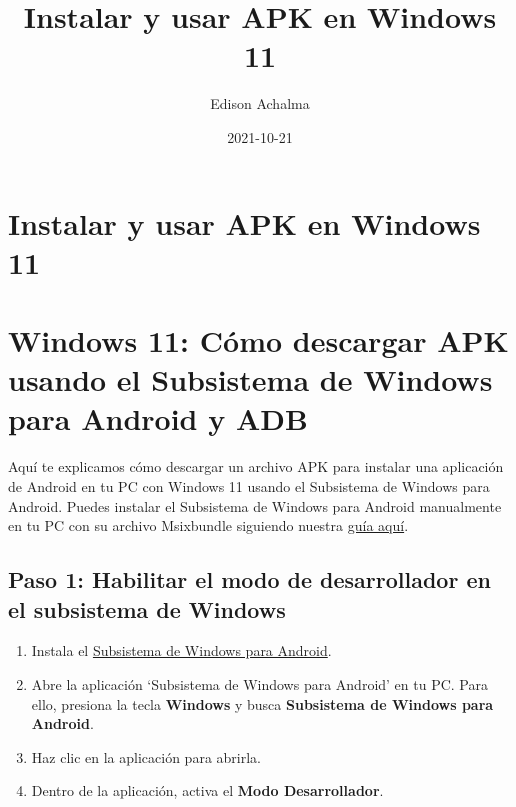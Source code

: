 \documentclass[
  doc,
  floatsintext,
  longtable,
  a4paper,
  nolmodern,
  notxfonts,
  notimes,
  12pt,
  colorlinks=true,linkcolor=blue,citecolor=blue,urlcolor=blue]{apa7}
\title{Instalar y usar APK en Windows 11}
\author{Edison Achalma}
\affiliation{
{Escuela Profesional de Economía, Universidad Nacional de San Cristóbal
de Huamanga}}
\date{2021-10-21}
\providecommand{\tightlist}{%
  \setlength{\itemsep}{0pt}\setlength{\parskip}{0pt}}
\begin{document}
\maketitle


\hypertarget{toc}{}
\tableofcontents
\newpage
\section[Introduction]{Instalar y usar APK en Windows 11}

\setcounter{secnumdepth}{3}

\setlength\LTleft{0pt}




\section{Windows 11: Cómo descargar APK usando el Subsistema de Windows
para Android y
ADB}\label{windows-11-cuxf3mo-descargar-apk-usando-el-subsistema-de-windows-para-android-y-adb}

Aquí te explicamos cómo descargar un archivo APK para instalar una
aplicación de Android en tu PC con Windows 11 usando el Subsistema de
Windows para Android. Puedes instalar el Subsistema de Windows para
Android manualmente en tu PC con su archivo Msixbundle siguiendo nuestra
\href{https://nerdschalk.com/android-apps-on-windows-11-dev-channel-how-to-install-windows-subsystem-for-android-manually-with-msixbundle/}{guía
aquí}.

\subsection{Paso 1: Habilitar el modo de desarrollador en el subsistema
de
Windows}\label{paso-1-habilitar-el-modo-de-desarrollador-en-el-subsistema-de-windows}

\begin{enumerate}
\def\labelenumi{\arabic{enumi}.}
\tightlist
\item
  Instala el
  \href{https://nerdschalk.com/android-apps-on-windows-11-dev-channel-how-to-install-windows-subsystem-for-android-manually-with-msixbundle/}{Subsistema
  de Windows para Android}.
\item
  Abre la aplicación `Subsistema de Windows para Android' en tu PC. Para
  ello, presiona la tecla \textbf{Windows} y busca \textbf{Subsistema de
  Windows para Android}.
\item
  Haz clic en la aplicación para abrirla.
\item
  Dentro de la aplicación, activa el \textbf{Modo Desarrollador}.
\end{enumerate}
\end{document}
